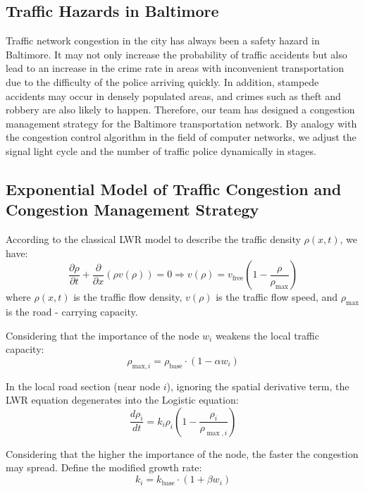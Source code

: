 \documentclass{mcmthesis}
\begin{document}
\subsection{Traffic Hazards in Baltimore}

Traffic network congestion in the city has always been a safety hazard in Baltimore. It may not only increase the probability of traffic accidents but also lead to an increase in the crime rate in areas with inconvenient transportation due to the difficulty of the police arriving quickly. In addition, stampede accidents may occur in densely populated areas, and crimes such as theft and robbery are also likely to happen. Therefore, our team has designed a congestion management strategy for the Baltimore transportation network. By analogy with the congestion control algorithm in the field of computer networks, we adjust the signal light cycle and the number of traffic police dynamically in stages.

\subsection{Exponential Model of Traffic Congestion and Congestion Management Strategy}


According to the classical LWR model to describe the traffic density $\rho(x,t)$, we have:
\begin{equation}
\frac{\partial \rho}{\partial t} + \frac{\partial}{\partial x} \left( \rho v(\rho) \right) = 0\Rightarrow v(\rho) = v_{\text{free}} \left( 1 - \frac{\rho}{\rho_{\text{max}}} \right)
\end{equation}
where $\rho(x,t)$ is the traffic flow density, $v(\rho)$ is the traffic flow speed, and $\rho_{\text{max}}$ is the road - carrying capacity.

Considering that the importance of the node $w_i$ weakens the local traffic capacity:
\begin{equation}
\rho_{\text{max},i} = \rho_{\text{base}} \cdot \left( 1 - \alpha w_i \right)
\end{equation}

In the local road section (near node $i$), ignoring the spatial derivative term, the LWR equation degenerates into the Logistic equation:
\begin{equation}
\frac{d\rho_i}{dt}=k_i\rho_i\left(1-\frac{\rho_i}{\rho_{\max,i}}\right)
\end{equation}

Considering that the higher the importance of the node, the faster the congestion may spread. Define the modified growth rate:
\begin{equation}
k_i=k_{\mathrm{base}}\cdot(1+\beta w_i)
\end{equation}
\end{document}
